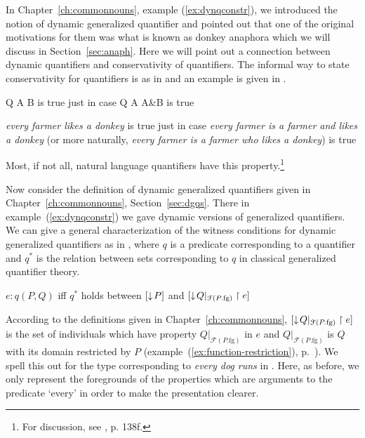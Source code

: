 In Chapter~\ref{ch:commonnouns}, example (\ref{ex:dynqconstr}), we
introduced the notion of dynamic generalized quantifier and pointed
out that one of the original motivations for them was what is known as
donkey anaphora which we will discuss in Section~\ref{sec:anaph}.
Here we will point out a connection between dynamic quantifiers and
conservativity of quantifiers.  The informal way to state
conservativity for quantifiers is as in  and an example is
given in .
\begin{ex} 
\begin{subex} 
 
\item Q A B is true just in case Q A A\&B is true 
 
\item \textit{every farmer likes a donkey} is true just in case
  \textit{every farmer is a farmer and likes a donkey} (or more
  naturally, \textit{every farmer is a farmer who likes a donkey}) is true
 
\end{subex} 
   
\end{ex} 
Most, if not all, natural language quantifiers have this
property.\footnote{For discussion, see \cite{PetersWesterstahl2006},
  p. 138f.}

Now consider the definition of dynamic generalized quantifiers given
in Chapter~\ref{ch:commonnouns}, Section~\ref{sec:dgqs}.  There in
example~(\ref{ex:dynqconstr}) we gave dynamic versions of generalized
quantifiers.  We can give a general characterization of the witness
conditions for dynamic generalized quantifiers as in \nexteg{}, where
$q$ is a predicate corresponding to a quantifier and $q^*$ is the
relation between sets corresponding to $q$ in classical generalized
quantifier theory.
\begin{ex} 
$e:q(P,Q)$ iff $q^*$ holds between $[\downarrow\!P]$ and
$[\downarrow\!Q|_{\mathcal{F}(P.\mathrm{fg})}\restriction e]$
\end{ex} 
According to the definitions given in Chapter~\ref{ch:commonnouns},
$[\downarrow\!Q|_{\mathcal{F}(P.\mathrm{fg})}\restriction e]$ is the set of
individuals which have property $Q|_{\mathcal{F}(P.\mathrm{fg})}$ in
$e$ and $Q|_{\mathcal{F}(P.\mathrm{fg})}$ is $Q$ with its
domain restricted by $P$ (example~(\ref{ex:function-restriction}), p.~\pageref{ex:function-restriction}).  We spell this out for the type
corresponding to \textit{every dog runs} in \nexteg{}.  Here, as
before, we only represent the foregrounds of the properties which are
arguments to the predicate `every' in order to make the presentation clearer.    

